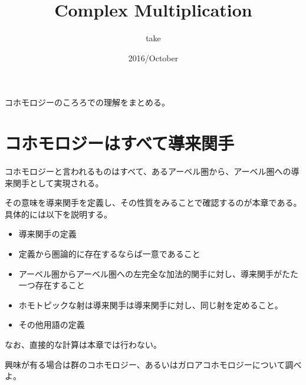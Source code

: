 \documentclass{ujarticle}
\title{Complex Multiplication}
\author{take}
\date{2016/October}
\begin{document}
コホモロジーのころろでの理解をまとめる。


\section{コホモロジーはすべて導来関手}
\label{sec:コホモロジーはすべて導来関手}

コホモロジーと言われるものはすべて、あるアーベル圏から、アーベル圏への導来関手として実現される。

その意味を導来関手を定義し、その性質をみることで確認するのが本章である。具体的には以下を説明する。
\begin{itemize}
  \item 導来関手の定義
  \item 定義から圏論的に存在するならば一意であること
 \item アーベル圏からアーベル圏への左完全な加法的関手に対し、導来関手がたた一つ存在すること
\item ホモトピックな射は導来関手は導来関手に対し、同じ射を定めること。
\item その他用語の定義
\end{itemize}
なお、直接的な計算は本章では行わない。

興味が有る場合は群のコホモロジー、あるいはガロアコホモロジーについて調べよ。
\end{document}
